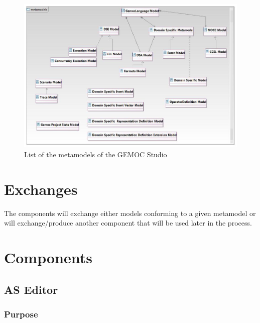 \documentclass{gemoc} %
\begin{document}
\begin{figure}[htp]
	\begin{center}
	\includegraphics*[trim=0.0cm 0.0cm 0cm 0.0cm, clip=true, width=1.0\linewidth]{../images/Gemoc Metamodels Class Diagram.jpg}
	\caption{List of the metamodels of the GEMOC Studio}
	\label{fig:MetamodelList}
	\end{center}
\end{figure}

\section{Exchanges}
The components will exchange either models conforming to a given metamodel or will exchange/produce another component that will be used later in the process.


\section{Components}


\subsection{AS Editor}


\subsubsection{Purpose}
\end{document}
